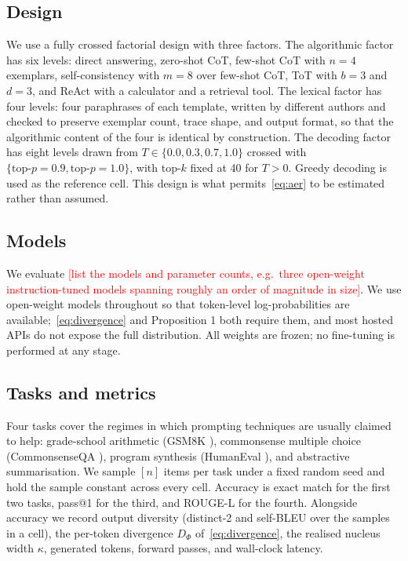 \documentclass[conference]{IEEEtran}
\begin{document}
\subsection{Design}
\label{sec:design}

We use a fully crossed factorial design with three factors. The algorithmic factor has six levels: direct answering, zero-shot CoT, few-shot CoT with $n = 4$ exemplars, self-consistency with $m = 8$ over few-shot CoT, ToT with $b = 3$ and $d = 3$, and ReAct with a calculator and a retrieval tool. The lexical factor has four levels: four paraphrases of each template, written by different authors and checked to preserve exemplar count, trace shape, and output format, so that the algorithmic content of the four is identical by construction. The decoding factor has eight levels drawn from $T \in \{0.0, 0.3, 0.7, 1.0\}$ crossed with $\{\text{top-}p=0.9, \text{top-}p=1.0\}$, with top-$k$ fixed at 40 for $T > 0$. Greedy decoding is used as the reference cell. This design is what permits~\eqref{eq:aer} to be estimated rather than assumed.

\subsection{Models}
\label{sec:models}

We evaluate \textcolor{red}{[list the models and parameter counts, e.g.\ three open-weight instruction-tuned models spanning roughly an order of magnitude in size]}. We use open-weight models throughout so that token-level log-probabilities are available;~\eqref{eq:divergence} and Proposition 1 both require them, and most hosted APIs do not expose the full distribution. All weights are frozen; no fine-tuning is performed at any stage.

\subsection{Tasks and metrics}
\label{sec:tasks}

Four tasks cover the regimes in which prompting techniques are usually claimed to help: grade-school arithmetic (GSM8K \cite{b18}), commonsense multiple choice (CommonsenseQA \cite{b19}), program synthesis (HumanEval \cite{b20}), and abstractive summarisation. We sample $[n]$ items per task under a fixed random seed and hold the sample constant across every cell. Accuracy is exact match for the first two tasks, pass@1 for the third, and ROUGE-L for the fourth. Alongside accuracy we record output diversity (distinct-2 and self-BLEU over the samples in a cell), the per-token divergence $D_{\Phi}$ of~\eqref{eq:divergence}, the realised nucleus width $\kappa$, generated tokens, forward passes, and wall-clock latency.
\end{document}
